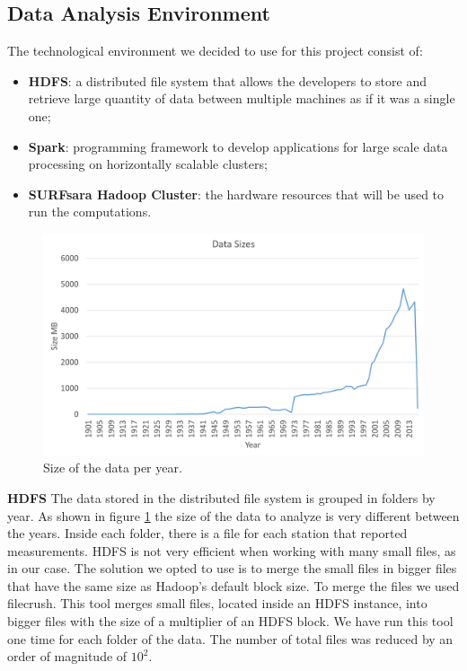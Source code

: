 \documentclass{vldb}
\begin{document}
\subsection{Data Analysis Environment}
The technological environment we decided to use for this project consist of:
\begin{itemize}
    \item \textbf{HDFS}\cite{hadoop}: a distributed file system that allows the developers to store and retrieve large quantity of data between multiple machines as if it was a single one;
    \item \textbf{Spark}\cite{spark}: programming framework to develop applications for large scale data processing on horizontally scalable clusters;
    \item \textbf{SURFsara Hadoop Cluster}: the hardware resources that will be used to run the computations.
\end{itemize}


\begin{figure}[tbh]
\includegraphics[width=1\linewidth]{dataSize}
\caption{Size of the data per year.}
\label{fig:dataSize}
\end{figure}

\textbf{HDFS}
The data stored in the distributed file system is grouped in folders by year. As shown in figure \ref{fig:dataSize} the size of the data to analyze is very different between the years. Inside each folder, there is a file for each station that reported measurements. HDFS is not very efficient when working with many small files\cite{zhang2012improving}, as in our case. The solution we opted to use is to merge the small files in bigger files that have the same size as Hadoop's default block size. To merge the files we used filecrush\cite{filecrush}. This tool merges small files, located inside an HDFS instance, into bigger files with the size of a multiplier of an HDFS block. We have run this tool one time for each folder of the data. The number of total files was reduced by an order of magnitude of $10^2$.\\
\end{document}
